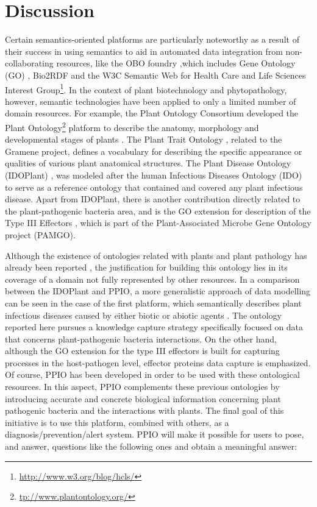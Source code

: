 \documentclass[sw]{iosart2c}
\newcommand{\myurl}[1]{\footnote{\url{#1}}}
\begin{document}
\section{Discussion}\label{sec:discussion}

Certain semantics-oriented platforms are particularly noteworthy as a result of their success in using semantics to aid in automated data  integration from non-collaborating resources, like the OBO foundry \cite{Smith},which includes Gene Ontology (GO) \cite{Gene}, Bio2RDF \cite{RDF} and the W3C Semantic  Web  for Health  Care  and  Life Sciences Interest Group\myurl{http://www.w3.org/blog/hcls/}. In the context of plant biotechnology and phytopathology, however, semantic technologies have been applied to only a limited number of domain resources. For example, the Plant Ontology Consortium developed the Plant Ontology\myurl{tp://www.plantontology.org/} platform to describe the anatomy, morphology and developmental stages of plants \cite{PO}. The Plant Trait Ontology \cite{PTO}, related to the Gramene project, defines a vocabulary for describing the specific appearance or qualities of various plant anatomical structures. The Plant Disease Ontology (IDOPlant) \cite{Walls}, was modeled after the human Infectious Diseases Ontology (IDO) \cite{IDO} to serve as a reference ontology that contained and covered any plant infectious disease. Apart from IDOPlant, there is another contribution directly related to the plant-pathogenic bacteria area, and is the GO extension for description of the Type III Effectors \cite{Lindeberg}, which is part of the Plant-Associated Microbe Gene Ontology project (PAMGO). 


Although the existence of ontologies related with plants and plant pathology has already been reported \cite{PTO} \cite{Lindeberg} \cite{Walls}, the justification for building this ontology lies in its coverage of a domain not fully represented by other resources. In a comparison between the IDOPlant and PPIO, a more generalistic approach of data modelling can be seen in the case of the first platform, which semantically describes plant infectious diseases caused by either biotic or abiotic agents . The ontology reported here pursues a knowledge capture strategy specifically focused on data that concerns plant-pathogenic bacteria interactions. On the other hand, although the GO extension for the type III effectors is built for capturing processes in the host-pathogen level, effector proteins data capture is emphasized. Of course, PPIO has been developed in order to be used with these ontological resources. In this aspect, PPIO complements these previous ontologies by introducing accurate and concrete biological information concerning plant pathogenic bacteria and the interactions with plants. The final goal of this initiative is to use this platform, combined with others, as a diagnosis/prevention/alert system. PPIO will make it possible for users to pose, and answer, questions like the following ones and obtain a meaningful answer:
\end{document}
